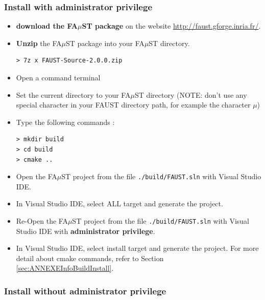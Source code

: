 \subsubsection{Install with administrator privilege}
\label{sec:AdminWinVisualStudioBasicInstall}
\begin{itemize}
\item \textbf{download the FA$\mu$ST package} on the website  \url{http://faust.gforge.inria.fr/}. 
\item \textbf{Unzip} the FA$\mu$ST package into your FA$\mu$ST directory. 
\begin{lstlisting}
> 7z x FAUST-Source-2.0.0.zip
\end{lstlisting}
\item Open a command terminal
\item Set the current directory to your FA$\mu$ST directory (NOTE: don't use any special character in your FAUST directory path, for example the character $\mu$)
\item Type the following commands : 
\begin{lstlisting}
> mkdir build
> cd build
> cmake .. 
\end{lstlisting}
\item Open the FA$\mu$ST project from the file \texttt{./build/FAUST.sln} with Visual Studio IDE.
\item In Visual Studio IDE, select ALL target and generate the project.
\item Re-Open the FA$\mu$ST project from the file \texttt{./build/FAUST.sln} with Visual Studio IDE with \textbf{administrator privilege}.
\item In Visual Studio IDE, select install target and generate the project.
For more detail about cmake commands, refer to Section \ref{sec:ANNEXEInfoBuildInstall}.
\end{itemize}

 
\subsubsection{Install without administrator privilege}
\label{sec:NoAdminWinVisualStudioBasicInstall}

